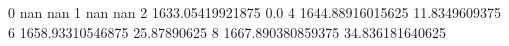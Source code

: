 0 nan nan
1 nan nan
2 1633.05419921875 0.0
4 1644.88916015625 11.8349609375
6 1658.93310546875 25.87890625
8 1667.890380859375 34.836181640625
